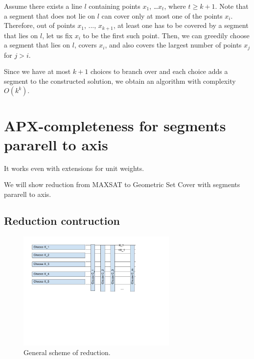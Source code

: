 \documentclass[en]{pracamgr}
\begin{document}
Assume there exists a line $l$ containing points $x_1$, \ldots $x_t$,
where $t \geq k + 1$.
Note that a segment that does not lie on $l$ can cover only at most one
of the points $x_i$.
Therefore, out of points $x_1$, ..., $x_{k+1}$,
at least one has to be covered by a segment that lies on $l$,
let us fix $x_i$ to be the first such point.
Then, we can greedily choose a segment that lies on $l$,
covers $x_i$,
and also covers the largest number of points $x_j$ for $j > i$.

Since we have at most $k + 1$ choices to branch over
and each choice adds a segment to the constructed solution,
we obtain an algorithm with complexity $O(k^k)$.

\section{APX-completeness for segments pararell to axis}
It works even with extensions for unit weights.

We will show reduction from MAXSAT
to Geometric Set Cover with segments pararell to axis.

\subsection{Reduction contruction}

\begin{figure}[h]
\includegraphics[width=0.7\textwidth]{segment_apx_sketch.jpg}
\caption{General scheme of reduction.}
\label{fig:segment_apx}
\end{figure}
\end{document}
